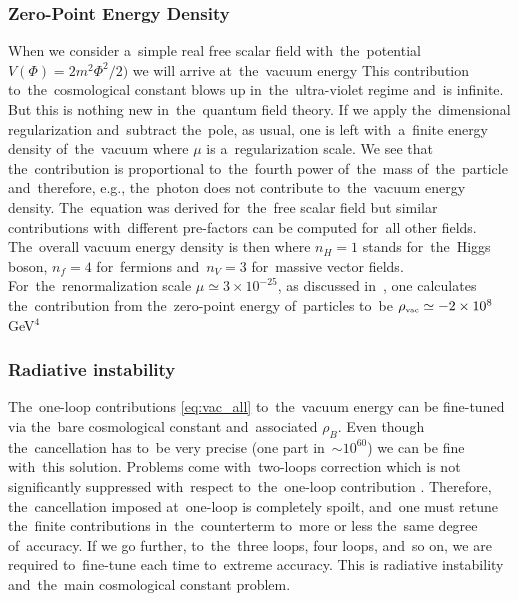 \subsubsection{Zero-Point Energy Density}
When we consider a~simple real free scalar field with~the~potential $V(\Phi)=2m^2\Phi^2/2)$ we will arrive at~the~vacuum energy
This contribution to~the~cosmological constant blows up in~the~ultra-violet regime and~is infinite. But this is nothing new in~the~quantum field theory. If we apply the~dimensional regularization \parencite{tHooft:1972tcz} and~subtract the~pole, as usual, one is left with~a~finite energy density of~the~vacuum
where $\mu$ is a~regularization scale. We see that the~contribution is proportional to~the~fourth power of~the~mass of~the~particle and~therefore, e.g., the~photon does not contribute to~the~vacuum energy density. The~equation was derived for~the~free scalar field but similar contributions with~different pre-factors can be computed for~all other fields. The~overall vacuum energy density is then
where $n_H=1$ stands for~the~Higgs boson, $n_f=4$ for~fermions and~$n_V=3$ for~massive vector fields. For~the~renormalization scale $\mu\simeq3\times10^{-25}$, as discussed in~\textcite{2011arXiv1105.6296K}, one calculates the~contribution from the~zero-point energy of~particles to~be  $\rho_\text{\tiny vac}\simeq-2\times10^8$ GeV$^4$
\subsubsection{Radiative instability}
The~one-loop contributions \eqref{eq:vac_all} to~the~vacuum energy can be fine-tuned via the~bare cosmological constant and~associated $\rho_B$. Even though the~cancellation has to~be very precise (one part in~$\sim10^{60}$) we can be fine with~this solution. Problems come with~two-loops correction which is not significantly suppressed with~respect to~the~one-loop contribution \parencite{2012CRPhy..13..566M}. Therefore, the~cancellation imposed at~one-loop is completely spoilt, and~one must retune the~finite contributions in~the~counterterm to~more or less the~same degree of~accuracy. If we go further, to~the~three loops, four loops, and~so on, we are required to~fine-tune each time to~extreme accuracy. This is radiative instability and~the~main cosmological constant problem.

